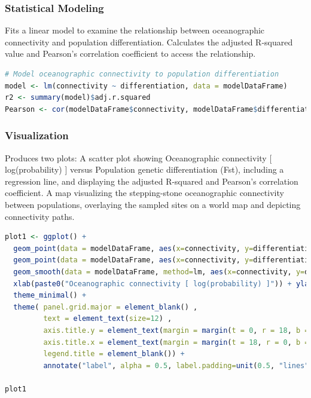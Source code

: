 \documentclass[
]{article}
\begin{document}
\subsubsection{Statistical Modeling}\label{statistical-modeling}

Fits a linear model to examine the relationship between oceanographic
connectivity and population differentiation. Calculates the adjusted
R-squared value and Pearson's correlation coefficient to access the
relationship.

\begin{lstlisting}[language=R]
# Model oceanographic connectivity to population differentiation
model <- lm(connectivity ~ differentiation, data = modelDataFrame)
r2 <- summary(model)$adj.r.squared
Pearson <- cor(modelDataFrame$connectivity, modelDataFrame$differentiation)
\end{lstlisting}

\subsubsection{Visualization}\label{visualization}

Produces two plots: A scatter plot showing Oceanographic connectivity
{[} log(probability) {]} versus Population genetic differentiation
(Fst), including a regression line, and displaying the adjusted
R-squared and Pearson's correlation coefficient. A map visualizing the
stepping-stone oceanographic connectivity between populations,
overlaying the sampled sites on a world map and depicting connectivity
paths.

\begin{lstlisting}[language=R]
plot1 <- ggplot() + 
  geom_point(data = modelDataFrame, aes(x=connectivity, y=differentiation), color="#000000", fill="#000000", size=2 ) + 
  geom_point(data = modelDataFrame, aes(x=connectivity, y=differentiation), color="white", fill="white", size=1 ) + 
  geom_smooth(data = modelDataFrame, method=lm, aes(x=connectivity, y=differentiation), linetype = "dashed", fill="#c5593c", col='black', size=0.5, alpha = 0.5) + 
  xlab(paste0("Oceanographic connectivity [ log(probability) ]")) + ylab("Population genetic differentiation (Fst)") +
  theme_minimal() + 
  theme( panel.grid.major = element_blank() ,
         text = element_text(size=12) ,
         axis.title.y = element_text(margin = margin(t = 0, r = 18, b = 0, l = 0)) ,
         axis.title.x = element_text(margin = margin(t = 18, r = 0, b = 0, l = 0)) ,
         legend.title = element_blank()) +
         annotate("label", alpha = 0.5, label.padding=unit(0.5, "lines"), x = -77, y = 0.2, hjust=0,vjust=1 , label = paste0("Adjusted R2: ", format(round(r2, 3), nsmall = 3),"\nPearson's Corr.: ",format(round(Pearson, 3), nsmall = 3)))

plot1
\end{lstlisting}
\end{document}

